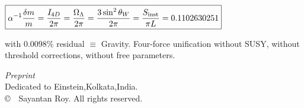 \documentclass[a4paper,1pt,oneside,openany]{book}
\begin{document}
\begin{titlepage}
\begin{minipage}{0.88\textwidth}
\vspace{0.3cm}
\large
$\displaystyle \boxed{
\alpha^{-1}\frac{\delta m}{m}= \frac{I_{4D}}{2\pi}= \frac{\Omega_\Lambda}{2\pi}= \frac{3\sin^2\theta_W}{2\pi}= \frac{S_{\rm inst}}{\pi L}=0.1102630251}$

\vspace{0.3cm}
\footnotesize
with $0.0098\%$ residual $\equiv$ Gravity. Four-force unification without SUSY, without threshold corrections, without free parameters.
\end{minipage}

\vfill

\begin{minipage}{0.85\textwidth}
\centering
\footnotesize
\textit{Preprint}\\[2pt]
Dedicated to Einstein,Kolkata,India.\\[2pt]
\copyright\ \the\year\ Sayantan Roy. All rights reserved.
\end{minipage}

\vspace{0.3cm}

\end{titlepage}
\end{document}
